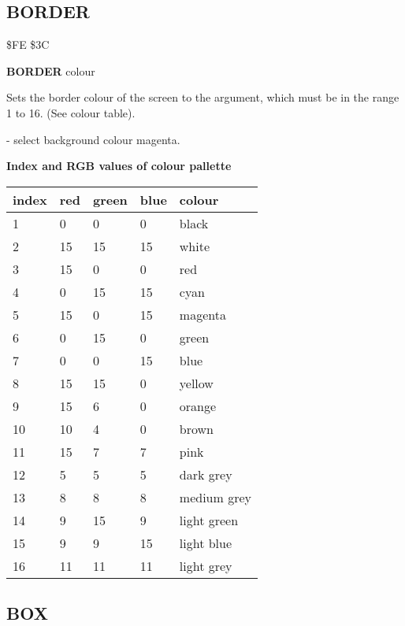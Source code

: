 \subsection{BORDER}
\begin{description}[leftmargin=3cm,style=nextline]
\item [Token:] \$FE \$3C
\item [Format:] {\bf BORDER} colour
\item [Usage:] Sets the border colour
               of the screen to the argument, which must be in the
               range 1 to 16. (See colour table).
\item [Example:]  - select background colour magenta.
\item [Colours:] {\bf Index and RGB values of colour pallette}

\ttfamily
{\setlength{\tabcolsep}{1mm}
\begin{tabular}{*{4}{|R{1.2cm}}|l|}
\hline
 index  &   red & green & blue & colour \\
 &    0  &   0   &  0   & black \\
  2 &   15  &  15   & 15   & white \\
  3 &   15  &   0   &  0   & red   \\
  4 &    0  &  15   & 15   & cyan  \\
  5 &   15  &   0   & 15   & magenta\\
  6 &    0  &  15   &  0   & green \\
  7 &    0  &   0   & 15   & blue  \\
  8 &   15  &  15   &  0   & yellow\\
  9 &   15  &   6   &  0   & orange\\
 10 &   10  &   4   &  0   & brown \\
 11 &   15  &   7   &  7   & pink  \\
 12 &    5  &   5   &  5   & dark grey\\
 13 &    8  &   8   &  8   & medium grey\\
 14 &    9  &  15   &  9   & light green \\
 15 &    9  &   9   & 15   & light blue\\
 16 &   11  &  11   & 11   & light grey\\
\hline
\end{tabular}
}
\end{description}


\newpage
\subsection{BOX}

